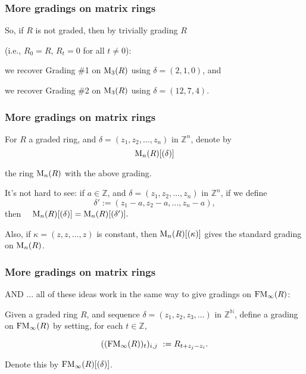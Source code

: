 \documentclass{beamer}
\begin{document}
  
  
\begin{frame}
\frametitle{More gradings on matrix rings}

So, if $R$ is not graded, then by trivially grading $R$  

  (i.e., $R_0 = R$, $R_t = 0$ for all $t \neq 0$):

\medskip
\bigskip


 we recover Grading $\#$1 on ${\rm M}_3(R)$ using $\delta = (2,1,0)$,  and
 
 \bigskip
 
  we recover Grading $\#$2 on ${\rm M}_3(R)$ using $\delta = (12,7,4)$.


\end{frame}


\begin{frame}
\frametitle{More gradings on matrix rings}



For $R$ a graded ring, and $\delta = (z_1, z_2, \dots , z_n)$ in $\mathbb{Z}^n$, denote by  
$$ {\rm M}_n(R)[(\delta)]$$

the ring ${\rm M}_n(R)$ with the above grading.   

\pause
\bigskip


It's not hard to see:   if $a \in \mathbb{Z}$, and 
$\delta = (z_1, z_2, \dots , z_n) $ in $ \mathbb{Z}^n$, if we define
$$\delta' := (z_1 - a, z_2 - a, \dots , z_n - a),$$
 then \ \ $ {\rm M}_n(R)[(\delta)] =  {\rm M}_n(R)[(\delta')].$

\pause
\bigskip


Also, if $\kappa = (z, z, \dots , z)$ is constant, then ${\rm M}_n(R)[(\kappa)]$ gives the standard grading on ${\rm M}_n(R)$. 

\end{frame}

\begin{frame}
\frametitle{More gradings on matrix rings}


AND ... all of these ideas work in the same way to give gradings on ${\rm FM}_\infty(R)$: 

\bigskip

Given a graded ring $R$, and  sequence $\delta = (z_1, z_2, z_3, \dots )$ in 
$\mathbb{Z}^{\mathbb{N}}$,  define a grading on ${\rm FM}_\infty(R)$ by setting, for each $t\in \mathbb{Z}$, 

$$ ( ( {\rm FM}_\infty(R) )_t )_{i,j} \ := R_{t + z_j - z_i}. $$

\medskip

Denote this by $ {\rm FM}_\infty(R) [(\delta)]$.  


\end{frame}
\end{document}
